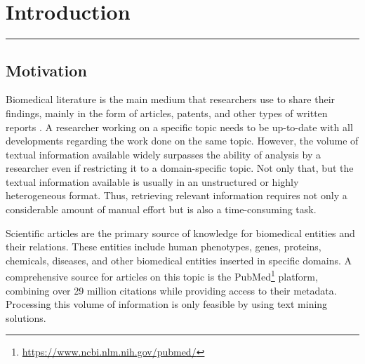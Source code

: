 \hypertarget{1}{}

\chapter{Introduction}


\vspace{-1.6cm}

\begingroup
\color{gray}
\par\noindent\rule{\textwidth}{0.4pt}
\endgroup



\section{Motivation}

Biomedical literature is the main medium that researchers use to share their findings, mainly in the form of articles, patents, and other types of written reports \citep{P99-1001}. A researcher working on a specific topic needs to be up-to-date with all developments regarding the work done on the same topic. However, the volume of textual information available widely surpasses the ability of analysis by a researcher even if restricting it to a domain-specific topic. Not only that, but the textual information available is usually in an unstructured or highly heterogeneous format. Thus, retrieving relevant information requires not only a considerable amount of manual effort but is also a time-consuming task. 

Scientific articles are the primary source of knowledge for biomedical entities and their relations. These entities include human phenotypes, genes, proteins, chemicals, diseases, and other biomedical entities inserted in specific domains. A comprehensive source for articles on this topic is the PubMed\footnote{\url{https://www.ncbi.nlm.nih.gov/pubmed/}} platform, combining over 29 million citations while providing access to their metadata. Processing this volume of information is only feasible by using text mining solutions.

